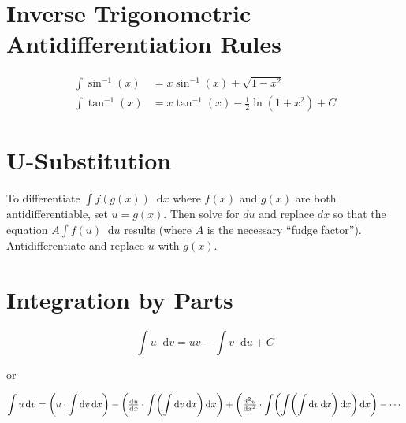 \documentclass[12pt]{article}
\DeclarePairedDelimiter\paren{(}{)}
\newcommand*{\asin}{\sin^{-1}}
\newcommand*{\atan}{\tan^{-1}}
\newcommand*{\D}[1]{\mathop{}\!\mathrm{d}#1}
\newcommand*{\fixmath}{%
  \makebox{}\vspace{\glueexpr-\baselineskip-\abovedisplayskip}}
\newenvironment{fixaskip}{\setlength{\abovedisplayskip}{0pt}\fixmath%
  \ignorespaces}{\ignorespacesafterend}
\newenvironment{fixbskip}{\setlength{\belowdisplayskip}{0pt}\ignorespaces}%
  {\ignorespacesafterend}
\newenvironment{fixskip}{\setlength{\abovedisplayskip}{0pt}%
  \setlength{\belowdisplayskip}{0pt}\fixmath\ignorespaces}%
  {\ignorespacesafterend}
\begin{document}
\section*{Inverse Trigonometric Antidifferentiation Rules}
\begin{fixskip}
  \begin{align*}
    \int \asin(x) &= x\asin(x) + \sqrt{1-x^2}\\
    \int \atan(x) &= x\atan(x) - \frac{1}{2} \ln(1 + x^2) + C
  \end{align*}
\end{fixskip}
\section*{U-Substitution}
To differentiate \(\int f(g(x)) \D{x}\) where \(f(x)\) and \(g(x)\) are both
antidifferentiable, set \(u = g(x)\). Then solve for \(du\) and replace \(dx\)
so that the equation \(A\int f(u) \D{u}\) results (where \(A\) is the necessary
``fudge factor''). Antidifferentiate and replace \(u\) with \(g(x)\).
\section*{Integration by Parts}
\begin{fixaskip}
  \[
    \int u \D{v} = uv - \int v \D{u} + C
  \]
\end{fixaskip}

or

\begin{fixbskip}
  \[
    \int u \D{v} = \paren*{u \cdot \int \D{v} \D{x}}
      - \paren*{\dd[u]{x} \cdot \int \paren*{ \int \D{v} \D{x}} \D{x}}
      + \paren*{\dd[2][u]{x} \cdot \int \paren*{\int \paren*{\int \D{v} \D{x}}
        \D{x}} \D{x}} - \cdots
  \]
\end{fixbskip}
\end{document}

